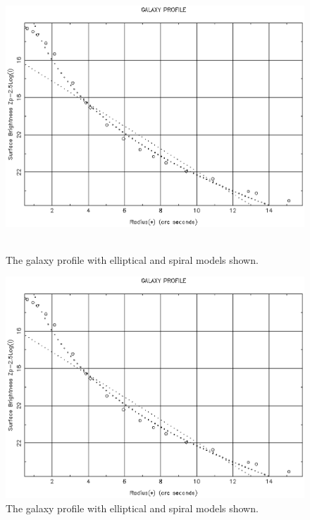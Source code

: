 \documentclass[twoside,11pt]{article}
\newenvironment{latexonly}{}{}
\begin{document}
\begin{latexonly}
\begin{figure}[htlb]
\centering 
\includegraphics[height=100mm,width=150mm]{sun180_diag5.eps}
\caption{The galaxy profile with elliptical and spiral models shown.}
\end{figure}
\end{latexonly}
\begin{htmlonly}
\begin{figure}[htlb]
\centering 
\includegraphics{sun180_diag5.eps}
\caption{The galaxy profile with elliptical and spiral models shown.}
\end{figure}
\end{htmlonly}
\end{document}
